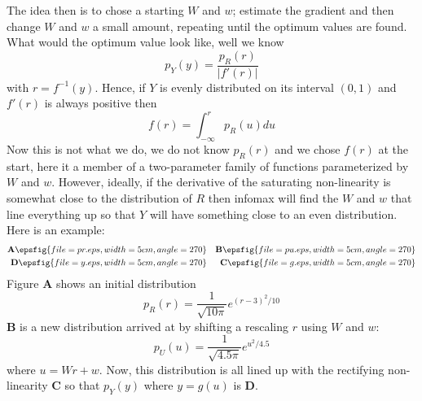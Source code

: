 \documentclass[12pt]{article}
\begin{document}
The idea then is to chose a starting $W$ and $w$; estimate the
gradient and then change $W$ and $w$ a small amount, repeating until
the optimum values are found. What would the optimum value look like, well we know
\begin{equation}
p_Y(y)=\frac{p_R(r)}{|f'(r)|}
\end{equation}
with $r=f^{-1}(y)$. Hence, if $Y$ is evenly distributed on its interval $(0,1)$ and $f'(r)$ is always positive then
\begin{equation}
f(r)=\int_{-\infty}^rp_R(u)du
\end{equation}
Now this is not what we do, we do not know $p_R(r)$ and we chose
$f(r)$ at the start, here it a member of a two-parameter family of
functions parameterized by $W$ and $w$. However, ideally, if the
derivative of the saturating non-linearity is somewhat close to the
distribution of $R$ then infomax will find the $W$ and $w$ that line
everything up so that $Y$ will have something close to an even
distribution. Here is an example:
\begin{eqnarray}
\textbf{A}\epsfig{file=pr.eps,width=5cm,angle=270}&&\textbf{B}\epsfig{file=pu.eps,width=5cm,angle=270}\cr
\textbf{D}\epsfig{file=y.eps,width=5cm,angle=270}&&\textbf{C}\epsfig{file=g.eps,width=5cm,angle=270}
\end{eqnarray}
Figure \textbf{A} shows an initial distribution 
\begin{equation}
p_R(r)=\frac{1}{\sqrt{10\pi}}e^{(r-3)^2/10}
\end{equation}
\textbf{B} is a new distribution arrived at by shifting a rescaling $r$ using $W$ and $w$:
\begin{equation}
p_U(u)=\frac{1}{\sqrt{4.5\pi}}e^{u^2/4.5}
\end{equation}
where $u=Wr+w$. Now, this distribution is all lined up with the
rectifying non-linearity \textbf{C} so that $p_Y(y)$ where $y=g(u)$ is \textbf{D}.
\end{document}

